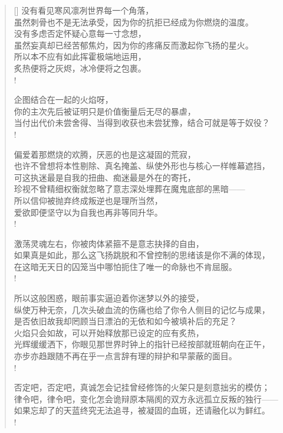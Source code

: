 \documentclass[UTF8, 12pt, a4paper]{ctexrep} %
\begin{document}
\begin{verse}[\versewidth]
没有看见寒风凛冽世界每一个角落，\\
虽然刺骨也不是无法承受，因为你的抗拒已经成为你燃烧的温度。\\
没有多虑否定怀疑心意每一寸念想，\\
虽然妄真却已经苦郁焦灼，因为你的疼痛反而激起你飞扬的星火。\\
所以本不应有如此挥霍极端地运用，\\
炙热便将之灰烬，冰冷便将之包裹。\\!

企图结合在一起的火焰呀，\\
你的主次先后被证明只是价值衡量后无尽的暴虐，\\
当付出代价未尝舍得、当得到收获也未尝犹豫，结合可就是等于奴役？\\!

偏爱着那燃烧的欢腾，厌恶的也是这凝固的荒寂，\\
也许不曾想将本性剔除、真名掩盖、纵使外形也与核心一样帷幕遮挡，\\
可这执迷最是自我的扭曲、痴迷最是外在的寄托，\\
珍视不曾精细权衡就忽略了意志深处埋葬在魔鬼底部的黑暗——\\
所以信仰被抛弃终成叛逆也是理所当然，\\
爱欲即便坚守以为自我也再非等同升华。\\!

激荡灵魂左右，你被肉体紧箍不是意志抉择的自由，\\
如果真是如此，那么这飞扬跳脱和不曾控制的思绪该是你不满的体现，\\
在这暗无天日的囚笼当中哪怕扼住了唯一的命脉也不肯屈服。\\!

所以这般困惑，眼前事实逼迫着你迷梦以外的接受，\\
纵使万种无奈，几次头破血流的伤痛也给了你令人侧目的记忆与成果，\\
是否依旧故我却罔顾当日漂泊的无依和如今被填补后的充足？\\
火焰只会如故，可以开始释放那已设定的应有炙热，\\
光辉缓缓洒下，你眼见那世界时钟上的指针已经按部就班朝向在正午，\\
亦步亦趋跟随不再在乎一点言辞有理的辩护和早蒙蔽的面目。\\!

否定吧，否定吧，真诚怎会记挂曾经修饰的火架只是刻意拙劣的模仿；\\
律令吧，律令吧，变化怎会诡辩原本隔阂的双方永远孤立反叛的独行——\\
如果忘却了的天蓝终究无法追寻，被凝固的血斑，还请融化以为鲜红。\\!


\end{verse}
\end{document}
